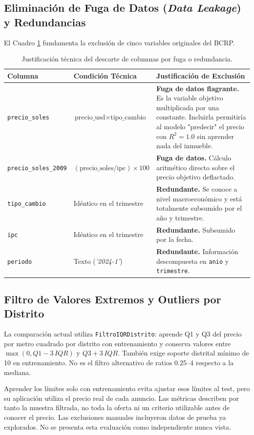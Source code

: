 \documentclass[11pt,a4paper]{article}
\begin{document}
\subsection{Eliminación de Fuga de Datos (\textit{Data Leakage}) y Redundancias}
El Cuadro \ref{tab:fuga_datos} fundamenta la exclusión de cinco variables originales del BCRP.

\begin{table}[H]
\centering
\small
\caption{Justificación técnica del descarte de columnas por fuga o redundancia.}
\label{tab:fuga_datos}
\begin{tabularx}{\textwidth}{lp{4cm}X}
\toprule
\textbf{Columna} & \textbf{Condición Técnica} & \textbf{Justificación de Exclusión} \\
\midrule
\texttt{precio\_soles} & $\text{precio\_usd} \times \text{tipo\_cambio}$ & \textbf{Fuga de datos flagrante.} Es la variable objetivo multiplicada por una constante. Incluirla permitiría al modelo "predecir" el precio con $R^2 = 1.0$ sin aprender nada del inmueble. \\
\texttt{precio\_soles\_2009} & $(\text{precio\_soles} / \text{ipc}) \times 100$ & \textbf{Fuga de datos.} Cálculo aritmético directo sobre el precio objetivo deflactado. \\
\texttt{tipo\_cambio} & Idéntico en el trimestre & \textbf{Redundante.} Se conoce a nivel macroeconómico y está totalmente subsumido por el año y trimestre. \\
\texttt{ipc} & Idéntico en el trimestre & \textbf{Redundante.} Subsumido por la fecha. \\
\texttt{periodo} & Texto (\textit{'2024-1'}) & \textbf{Redundante.} Información descompuesta en \texttt{anio} y \texttt{trimestre}. \\
\bottomrule
\end{tabularx}
\end{table}

\subsection{Filtro de Valores Extremos y Outliers por Distrito}
La comparación actual utiliza \texttt{FiltroIQRDistrito}: aprende Q1 y Q3 del precio por metro cuadrado por distrito con entrenamiento y conserva valores entre $\max(0,Q1-3\,IQR)$ y $Q3+3\,IQR$. También exige soporte distrital mínimo de 10 en entrenamiento. No es el filtro alternativo de ratios 0.25--4 respecto a la mediana.

Aprender los límites solo con entrenamiento evita ajustar esos límites al test, pero su aplicación utiliza el precio real de cada anuncio. Las métricas describen por tanto la muestra filtrada, no toda la oferta ni un criterio utilizable antes de conocer el precio. Las exclusiones manuales incluyeron datos de prueba ya explorados. No se presenta esta evaluación como independiente nunca vista.
\end{document}
